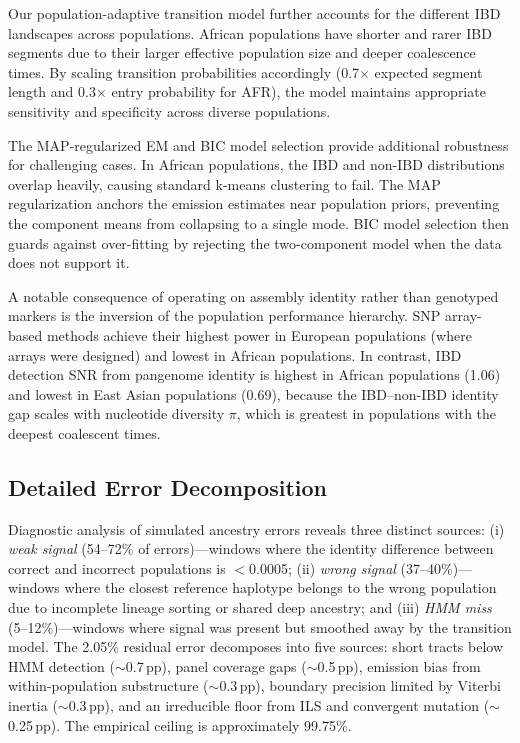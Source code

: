 \documentclass[11pt]{article}
\begin{document}
Our population-adaptive transition model further accounts for the different IBD landscapes across populations. African populations have shorter and rarer IBD segments due to their larger effective population size and deeper coalescence times. By scaling transition probabilities accordingly (0.7$\times$ expected segment length and 0.3$\times$ entry probability for AFR), the model maintains appropriate sensitivity and specificity across diverse populations.

The MAP-regularized EM and BIC model selection provide additional robustness for challenging cases. In African populations, the IBD and non-IBD distributions overlap heavily, causing standard k-means clustering to fail. The MAP regularization anchors the emission estimates near population priors, preventing the component means from collapsing to a single mode. BIC model selection then guards against over-fitting by rejecting the two-component model when the data does not support it.

A notable consequence of operating on assembly identity rather than genotyped markers is the inversion of the population performance hierarchy. SNP array-based methods achieve their highest power in European populations (where arrays were designed) and lowest in African populations. In contrast, IBD detection SNR from pangenome identity is highest in African populations (1.06) and lowest in East Asian populations (0.69), because the IBD--non-IBD identity gap scales with nucleotide diversity $\pi$, which is greatest in populations with the deepest coalescent times.

\subsection{Detailed Error Decomposition}
\label{sec:supp_error_decomposition}

Diagnostic analysis of simulated ancestry errors reveals three distinct sources: (i) \emph{weak signal} (54--72\% of errors)---windows where the identity difference between correct and incorrect populations is $<$0.0005; (ii) \emph{wrong signal} (37--40\%)---windows where the closest reference haplotype belongs to the wrong population due to incomplete lineage sorting or shared deep ancestry; and (iii) \emph{HMM miss} (5--12\%)---windows where signal was present but smoothed away by the transition model. The 2.05\% residual error decomposes into five sources: short tracts below HMM detection ($\sim$0.7\,pp), panel coverage gaps ($\sim$0.5\,pp), emission bias from within-population substructure ($\sim$0.3\,pp), boundary precision limited by Viterbi inertia ($\sim$0.3\,pp), and an irreducible floor from ILS and convergent mutation ($\sim$0.25\,pp). The empirical ceiling is approximately 99.75\%.
\end{document}

